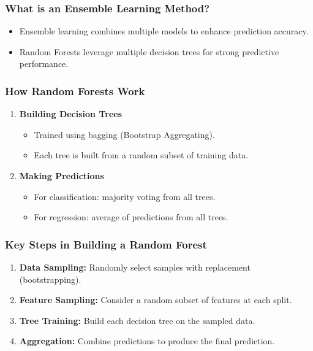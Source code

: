 \documentclass[aspectratio=169]{beamer}
\begin{document}
\begin{frame}[fragile]
    \frametitle{What is an Ensemble Learning Method?}
    \begin{itemize}
        \item Ensemble learning combines multiple models to enhance prediction accuracy.
        \item Random Forests leverage multiple decision trees for strong predictive performance.
    \end{itemize}
\end{frame}

\begin{frame}[fragile]
    \frametitle{How Random Forests Work}
    \begin{enumerate}
        \item \textbf{Building Decision Trees}
        \begin{itemize}
            \item Trained using bagging (Bootstrap Aggregating).
            \item Each tree is built from a random subset of training data.
        \end{itemize}
        \item \textbf{Making Predictions}
        \begin{itemize}
            \item For classification: majority voting from all trees.
            \item For regression: average of predictions from all trees.
        \end{itemize}
    \end{enumerate}
\end{frame}

\begin{frame}[fragile]
    \frametitle{Key Steps in Building a Random Forest}
    \begin{enumerate}
        \item \textbf{Data Sampling:} Randomly select samples with replacement (bootstrapping).
        \item \textbf{Feature Sampling:} Consider a random subset of features at each split.
        \item \textbf{Tree Training:} Build each decision tree on the sampled data.
        \item \textbf{Aggregation:} Combine predictions to produce the final prediction.
    \end{enumerate}
\end{frame}
\end{document}
